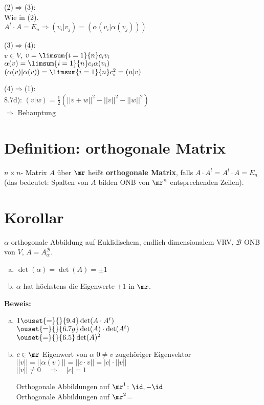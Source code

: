 	(2)$ \Rightarrow $(3):\\
	Wie in (2).\\
	$ A^t\cdot A=E_n\Rightarrow(v_i|v_j)=(\alpha(v_i|\alpha(v_j))) $
	
	(3)$ \Rightarrow $(4):\\
	$ v\in V $, $ v=\limsum{i=1}{n}c_iv_i $\\
	$ \alpha(v)=\limsum{i=1}{n}c_i\alpha(v_i) $\\
	$ (\alpha(v)|\alpha(v))=\limsum{i=1}{n}c_i^2=(u|v) $
	
	(4)$ \Rightarrow $(1):\\
	8.7d): $ (v|w)=\frac{1}{2}(||v+w||^2-||v||^2-||w||^2) $\\
	$ \Rightarrow $ Behauptung
	
\section{Definition: orthogonale Matrix}
	$ n\times n $- Matrix $ A $ über $ \mr $ heißt \textbf{orthogonale Matrix}, falls $ A\cdot A^t =A^t\cdot A=E_n$\\
	(das bedeutet: Spalten von $ A $ bilden ONB von $ \mr^n $ entsprechenden Zeilen).
	
\section{Korollar}
	$ \alpha $ orthogonale Abbildung auf Euklidischem, endlich dimensionalem VRV, $ \mathcal{B} $ ONB von $ V $, $ A=A_\alpha^{\mathcal{B}} $.
	\begin{enumerate}[a)]
		\item $ \det(\alpha)=\det(A)=\pm 1 $
		\item  $ \alpha $ hat höchstens die Eigenwerte $ \pm 1 $ in $ \mr $.
	\end{enumerate}
	
	\textbf{Beweis:}
	\begin{enumerate}[a)]
		\item $ 1\ouset{=}{}{9.4}\det(A\cdot A^t) $\\
		$ \ouset{=}{}{6.7g}\det(A)\cdot\det(A^t) $\\
		$ \ouset{=}{}{6.5}\det(A)^2 $
		\item $ c\in\mr $ Eigenwert von $ \alpha $ $ 0\neq v $ zugehöriger Eigenvektor\\
		$ ||v||=||\alpha(v)||=||c\cdot v||=|c|\cdot||v|| $\\
		$ ||v||\neq 0\quad\Rightarrow\quad |c|=1 $
		
		Orthogonale Abbildungen auf $ \mr^1 $: $ \id, -\id $\\
		Orthogonale Abbildungen auf $ \mr^2 $=
	\end{enumerate}
	
